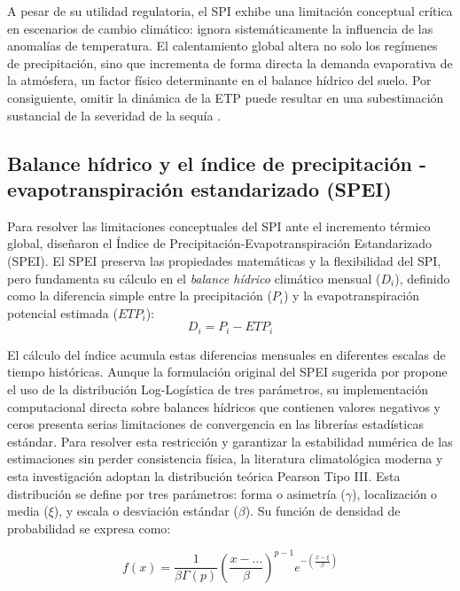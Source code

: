 A pesar de su utilidad regulatoria, el SPI exhibe una limitación conceptual crítica en escenarios de cambio climático: ignora sistemáticamente la influencia de las anomalías de temperatura. El calentamiento global altera no solo los regímenes de precipitación, sino que incrementa de forma directa la demanda evaporativa de la atmósfera, un factor físico determinante en el balance hídrico del suelo. Por consiguiente, omitir la dinámica de la ETP puede resultar en una subestimación sustancial de la severidad de la sequía \cite{massondelmotte2021}.

\subsection{Balance hídrico y el índice de precipitación - evapotranspiración estandarizado (SPEI)}

Para resolver las limitaciones conceptuales del SPI ante el incremento térmico global,  diseñaron el Índice de Precipitación-Evapotranspiración Estandarizado (SPEI). El SPEI preserva las propiedades matemáticas y la flexibilidad del SPI, pero fundamenta su cálculo en el \textit{balance hídrico} climático mensual ($D_i$), definido como la diferencia simple entre la precipitación ($P_i$) y la evapotranspiración potencial estimada ($ETP_i$):
\begin{equation}
    D_i = P_i - ETP_i
\end{equation}

El cálculo del índice acumula estas diferencias mensuales en diferentes escalas de tiempo históricas. Aunque la formulación original del SPEI sugerida por  propone el uso de la distribución Log-Logística de tres parámetros, su implementación computacional directa sobre balances hídricos que contienen valores negativos y ceros presenta serias limitaciones de convergencia en las librerías estadísticas estándar. Para resolver esta restricción y garantizar la estabilidad numérica de las estimaciones sin perder consistencia física, la literatura climatológica moderna y esta investigación adoptan la distribución teórica Pearson Tipo III. Esta distribución se define por tres parámetros: forma o asimetría ($\gamma$), localización o media ($\xi$), y escala o desviación estándar ($\beta$). Su función de densidad de probabilidad se expresa como:

\begin{equation}
    f(x) = \frac{1}{\beta \Gamma(p)} \left( \frac{x - \dots}{\beta} \right)^{p-1} e^{-\left(\frac{x - \xi}{\beta}\right)}
\end{equation}

